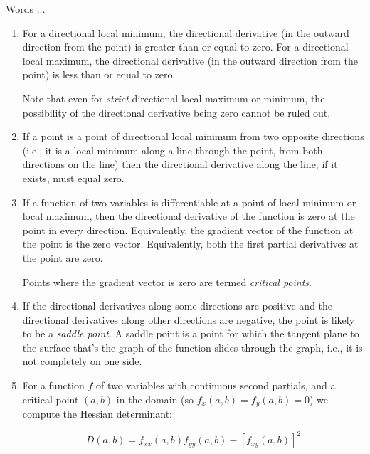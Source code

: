\documentclass[10pt]{amsart}
\begin{document}
Words ...

\begin{enumerate}
\item For a directional local minimum, the directional derivative (in
  the outward direction from the point) is greater than or equal to
  zero. For a directional local maximum, the directional derivative
  (in the outward direction from the point) is less than or equal to
  zero.

  Note that even for {\em strict} directional local maximum or
  minimum, the possibility of the directional derivative being zero
  cannot be ruled out.
\item If a point is a point of directional local minimum from two
  opposite directions (i.e., it is a local minimum along a line
  through the point, from both directions on the line) then the
  directional derivative along the line, if it exists, must equal
  zero.
\item If a function of two variables is differentiable at a point of
  local minimum or local maximum, then the directional derivative of
  the function is zero at the point in every direction. Equivalently,
  the gradient vector of the function at the point is the zero
  vector. Equivalently, both the first partial derivatives at the
  point are zero.
  
  Points where the gradient vector is zero are termed {\em critical
  points}. 
\item If the directional derivatives along some directions are
  positive and the directional derivatives along other directions are
  negative, the point is likely to be a {\em saddle point}. A saddle
  point is a point for which the tangent plane to the surface that's
  the graph of the function slides through the graph, i.e., it is not
  completely on one side.
\item For a function $f$ of two variables with continuous second
  partials, and a critical point $(a,b)$ in the domain (so $f_x(a,b) =
  f_y(a,b) = 0$) we compute the Hessian determinant:

  $$D(a,b) = f_{xx}(a,b)f_{yy}(a,b) - [f_{xy}(a,b)]^2$$


\end{enumerate}
\end{document}
